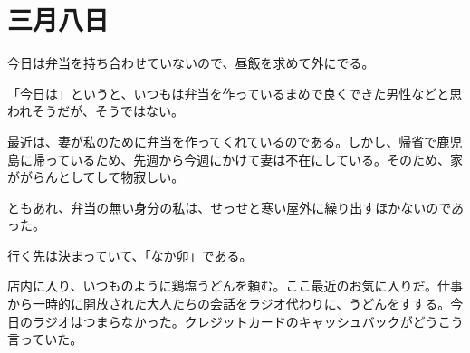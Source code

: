 \chapter{三月八日}

今日は弁当を持ち合わせていないので、昼飯を求めて外にでる。

 「今日は」というと、いつもは弁当を作っているまめで良くできた男性などと思われそうだが、そうではない。

 最近は、妻が私のために弁当を作ってくれているのである。しかし、帰省で鹿児島に帰っているため、先週から今週にかけて妻は不在にしている。そのため、家ががらんとしてして物寂しい。
 
ともあれ、弁当の無い身分の私は、せっせと寒い屋外に繰り出すほかないのであった。

 行く先は決まっていて、「なか卯」である。

店内に入り、いつものように鶏塩うどんを頼む。ここ最近のお気に入りだ。仕事から一時的に開放された大人たちの会話をラジオ代わりに、うどんをすする。今日のラジオはつまらなかった。クレジットカードのキャッシュバックがどうこう言っていた。
